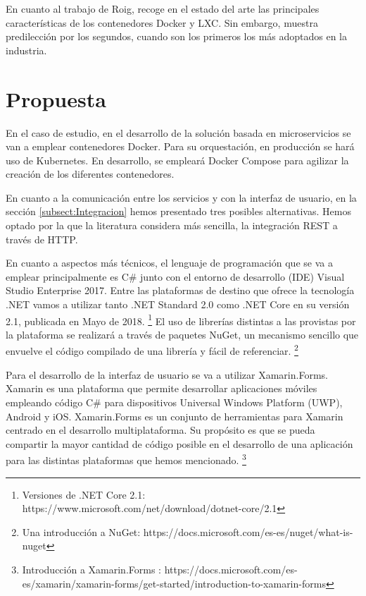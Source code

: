 \documentclass[11pt,spanish,listoffigures]{tfgetsinf}
\begin{document}
En cuanto al trabajo de Roig, recoge en el estado del arte las principales características de los contenedores Docker y LXC. Sin embargo, muestra predilección por los segundos, cuando son los primeros los más adoptados en la industria.

\section{Propuesta} \label{sect:Propuesta}

En el caso de estudio, en el desarrollo de la solución basada en microservicios se van a emplear contenedores Docker. Para su orquestación, en producción se hará uso de Kubernetes. En desarrollo, se empleará Docker Compose para agilizar la creación de los diferentes contenedores. 

En cuanto a la comunicación entre los servicios y con la interfaz de usuario, en la sección \ref{subsect:Integracion}  hemos presentado tres posibles alternativas. Hemos optado por la que la literatura considera más sencilla, la integración REST a través de HTTP.

En cuanto a aspectos más técnicos, el lenguaje de programación que se va a emplear principalmente es C\# junto con el entorno de desarrollo (IDE) Visual Studio Enterprise 2017. Entre las plataformas de destino que ofrece la tecnología .NET vamos a utilizar tanto .NET Standard 2.0 como .NET Core en su versión 2.1, publicada en Mayo de 2018. \footnote{ Versiones de .NET Core 2.1: https://www.microsoft.com/net/download/dotnet-core/2.1} El uso de librerías distintas a las provistas por la plataforma se realizará a través de paquetes NuGet, un mecanismo sencillo que envuelve el código compilado de una librería y fácil de referenciar. \footnote{ Una introducción a NuGet: https://docs.microsoft.com/es-es/nuget/what-is-nuget}

Para el desarrollo de la interfaz de usuario se va a utilizar Xamarin.Forms. Xamarin es una plataforma que permite desarrollar aplicaciones móviles  empleando código C\# para dispositivos Universal Windows Platform (UWP), Android y iOS. Xamarin.Forms es un conjunto de herramientas para Xamarin centrado en el desarrollo multiplataforma. Su propósito es que se pueda compartir la mayor cantidad de código posible en el desarrollo de una aplicación para las distintas plataformas que hemos mencionado. \footnote{ Introducción a Xamarin.Forms
: https://docs.microsoft.com/es-es/xamarin/xamarin-forms/get-started/introduction-to-xamarin-forms}
\end{document}

